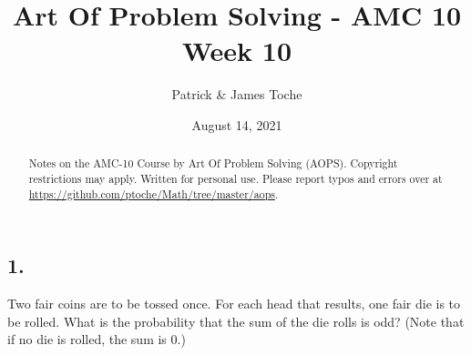 \documentclass[12pt]{article}
\title{Art Of Problem Solving - AMC 10 \\ Week 10}
\author{Patrick \& James Toche}
\date{August 14, 2021}
\begin{document}
\maketitle
\begin{minipage}{\textwidth}
\begin{abstract}\setlength{\parindent}{0pt}%
Notes on the AMC-10 Course by Art Of Problem Solving (AOPS).
Copyright restrictions may apply. Written for personal use. 
Please report typos and errors over at \url{https://github.com/ptoche/Math/tree/master/aops}. 
\end{abstract}
\end{minipage}

\thispagestyle{empty}
\clearpage


\subsection*{1.}

\nopagebreak

Two fair coins are to be tossed once. For each head that results, one fair die is to be rolled. What is the probability that the sum of the die rolls is odd? (Note that if no die is rolled, the sum is 0.)

\nopagebreak

\end{document}
